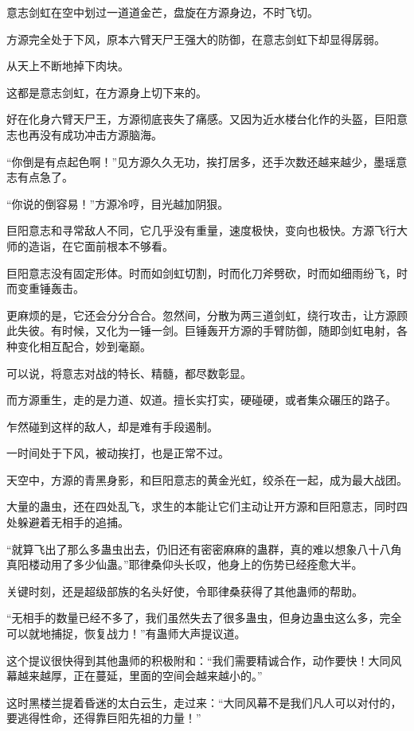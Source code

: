 \begin{this_body}
意志剑虹在空中划过一道道金芒，盘旋在方源身边，不时飞切。

方源完全处于下风，原本六臂天尸王强大的防御，在意志剑虹下却显得孱弱。

从天上不断地掉下肉块。

这都是意志剑虹，在方源身上切下来的。

好在化身六臂天尸王，方源彻底丧失了痛感。又因为近水楼台化作的头盔，巨阳意志也再没有成功冲击方源脑海。

“你倒是有点起色啊！”见方源久久无功，挨打居多，还手次数还越来越少，墨瑶意志有点急了。

“你说的倒容易！”方源冷哼，目光越加阴狠。

巨阳意志和寻常敌人不同，它几乎没有重量，速度极快，变向也极快。方源飞行大师的造诣，在它面前根本不够看。

巨阳意志没有固定形体。时而如剑虹切割，时而化刀斧劈砍，时而如细雨纷飞，时而变重锤轰击。

更麻烦的是，它还会分分合合。忽然间，分散为两三道剑虹，绕行攻击，让方源顾此失彼。有时候，又化为一锤一剑。巨锤轰开方源的手臂防御，随即剑虹电射，各种变化相互配合，妙到毫巅。

可以说，将意志对战的特长、精髓，都尽数彰显。

而方源重生，走的是力道、奴道。擅长实打实，硬碰硬，或者集众碾压的路子。

乍然碰到这样的敌人，却是难有手段遏制。

一时间处于下风，被动挨打，也是正常不过。

天空中，方源的青黑身影，和巨阳意志的黄金光虹，绞杀在一起，成为最大战团。

大量的蛊虫，还在四处乱飞，求生的本能让它们主动让开方源和巨阳意志，同时四处躲避着无相手的追捕。

“就算飞出了那么多蛊虫出去，仍旧还有密密麻麻的蛊群，真的难以想象八十八角真阳楼动用了多少仙蛊。”耶律桑仰头长叹，他身上的伤势已经痊愈大半。

关键时刻，还是超级部族的名头好使，令耶律桑获得了其他蛊师的帮助。

“无相手的数量已经不多了，我们虽然失去了很多蛊虫，但身边蛊虫这么多，完全可以就地捕捉，恢复战力！”有蛊师大声提议道。

这个提议很快得到其他蛊师的积极附和：“我们需要精诚合作，动作要快！大同风幕越来越厚，正在蔓延，里面的空间会越来越小的。”

这时黑楼兰提着昏迷的太白云生，走过来：“大同风幕不是我们凡人可以对付的，要逃得性命，还得靠巨阳先祖的力量！”


\end{this_body}
